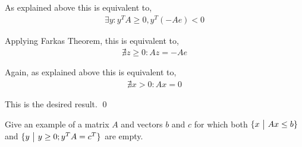 \documentclass[10pt]{article}
\begin{document}
\begin{solution}
As explained above this is equivalent to,
\begin{align*}
    \exists y: y^TA \geq 0, y^T(-Ae) < 0
\end{align*}

Applying Farkas Theorem, this is equivalent to,
\begin{align*}
    \nexists z\geq 0: Az = -Ae
\end{align*}

Again, as explained above this is equivalent to,
\begin{align*}
    \nexists x > 0 : Ax = 0
\end{align*}


This is the desired result. \qed

\pagebreak
\end{solution}

\begin{problem}[Exercise 2.26]
    Give an example of a matrix \( A \) and vectors \( b \) and \( c \) for which both \( \{x ~\big|~ Ax \leq b \} \) and \( \{y ~\big|~ y\geq 0; y^TA = c^T \} \) are empty.
\end{problem}
\end{document}
